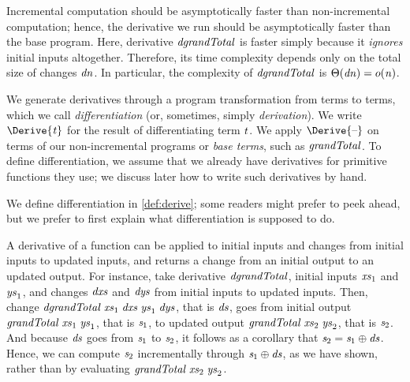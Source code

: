 Incremental computation should be asymptotically faster than non-incremental
computation; hence, the derivative we run should be asymptotically faster than
the base program.
Here, derivative \ensuremath{\Varid{dgrandTotal}} is faster simply because it \emph{ignores} initial
inputs altogether. Therefore, its time complexity depends only on the total size
of changes \ensuremath{\Varid{dn}}. In particular, the complexity of \ensuremath{\Varid{dgrandTotal}} is \ensuremath{\Theta(\Varid{dn})\mathrel{=}o(\Varid{n})}.

We generate derivatives through a program transformation from terms to terms,
which we call \emph{differentiation} (or, sometimes, simply \emph{derivation}).
We write \ensuremath{\Derive{\Varid{t}}} for the result of
differentiating term \ensuremath{\Varid{t}}. We apply \ensuremath{\Derive{\text{\textendash}}} on terms of our non-incremental
programs or \emph{base terms}, such as \ensuremath{\Varid{grandTotal}}. To define differentiation,
we assume that we already have derivatives for primitive functions they use; we
discuss later how to write such derivatives by hand.

We define differentiation in \cref{def:derive}; some readers might prefer to
peek ahead, but we prefer to first explain what differentiation is supposed to do.

A derivative of a function can be applied to initial inputs and changes from initial
inputs to updated inputs, and returns a change from an initial output to an
updated output. For instance, take derivative \ensuremath{\Varid{dgrandTotal}}, initial inputs
\ensuremath{\Varid{xs}_{1}} and \ensuremath{\Varid{ys}_{1}}, and changes \ensuremath{\Varid{dxs}} and \ensuremath{\Varid{dys}} from initial inputs to updated
inputs. Then, change \ensuremath{\Varid{dgrandTotal}\;\Varid{xs}_{1}\;\Varid{dxs}\;\Varid{ys}_{1}\;\Varid{dys}}, that is \ensuremath{\Varid{ds}}, goes from initial
output \ensuremath{\Varid{grandTotal}\;\Varid{xs}_{1}\;\Varid{ys}_{1}}, that is \ensuremath{\Varid{s}_{1}}, to updated output \ensuremath{\Varid{grandTotal}\;\Varid{xs}_{2}\;\Varid{ys}_{2}}, that is \ensuremath{\Varid{s}_{2}}. And because \ensuremath{\Varid{ds}} goes from \ensuremath{\Varid{s}_{1}} to \ensuremath{\Varid{s}_{2}}, it follows as a
corollary that \ensuremath{\Varid{s}_{2}\mathrel{=}\Varid{s}_{1}\oplus \Varid{ds}}. Hence, we can compute \ensuremath{\Varid{s}_{2}} incrementally
through \ensuremath{\Varid{s}_{1}\oplus \Varid{ds}}, as we have shown, rather than by evaluating
\ensuremath{\Varid{grandTotal}\;\Varid{xs}_{2}\;\Varid{ys}_{2}}.

